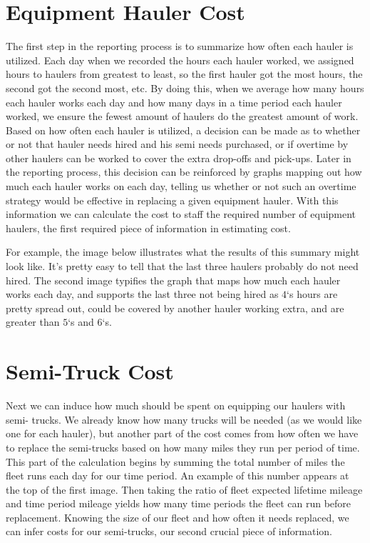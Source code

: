 \documentclass[letterpaper,10pt,english]{sphinxmanual}
\begin{document}
\section{Equipment Hauler Cost}
\label{\detokenize{reporting:equipment-hauler-cost}}
The first step in the reporting process is to summarize how often each hauler
is utilized. Each day when we recorded the hours each hauler worked, we
assigned hours to haulers from greatest to least, so the first hauler got the
most hours, the second got the second most, etc. By doing this, when we
average how many hours each hauler works each day and how many days in a time
period each hauler worked, we ensure the fewest amount of haulers do the greatest
amount of work. Based on how often each hauler is utilized, a decision can be
made as to whether or not that hauler needs hired and his semi needs purchased,
or if overtime by other haulers can be worked to cover the extra drop-offs
and pick-ups. Later in the reporting process, this decision can be reinforced
by graphs mapping out how much each hauler works on each day, telling us
whether or not such an overtime strategy would be effective in replacing a
given equipment hauler. With this information we can calculate the cost to
staff the required number of equipment haulers, the first required piece of
information in estimating cost.

For example, the image below illustrates what the results of this summary
might look like. It's pretty easy to tell that the last three haulers
probably do not need hired. The second image typifies the graph that maps
how much each hauler works each day, and supports the last three not being
hired as \(4\)`s hours are pretty spread out, could be covered by another
hauler working extra, and are greater than \(5\)`s and \(6\)`s.

\noindent{}

\noindent{}


\section{Semi-Truck Cost}
\label{\detokenize{reporting:semi-truck-cost}}
Next we can induce how much should be spent on equipping our haulers with semi-
trucks. We already know how many trucks will be needed (as we would like one
for each hauler), but another part of the cost comes from how often we have
to replace the semi-trucks based on how many miles they run per period of
time. This part of the calculation begins by summing the total number
of miles the fleet runs each day for our time period. An example of this
number appears at the top of the first image. Then taking the ratio of fleet
expected lifetime mileage and time period mileage yields how many time periods
the fleet can run before replacement. Knowing the size of our fleet and how
often it needs replaced, we can infer costs for our semi-trucks, our second
crucial piece of information.
\end{document}
